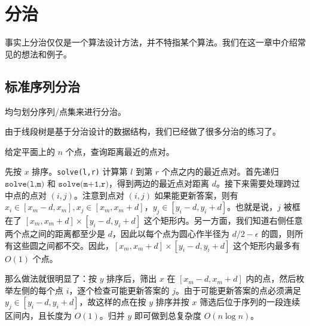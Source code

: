 \chapter{分治}

事实上分治仅仅是一个算法设计方法，并不特指某个算法。我们在这一章中介绍常见的想法和例子。

\section{标准序列分治}

均匀划分序列/点集来进行分治。

\begin{example}[可以用线段树维护的诸多信息]
    由于线段树是基于分治设计的数据结构，我们已经做了很多分治的练习了。
\end{example}

\begin{example}[平面最近点对]
    给定平面上的 $n$ 个点，查询距离最近的点对。
\end{example}
\begin{solution}
    先按 $x$ 排序。\texttt{solve(l,r)} 计算第 $l$ 到第 $r$ 个点之内的最近点对。首先递归 $\texttt{solve(l,m)}$ 和 $\texttt{solve(m+1,r)}$，得到两边的最近点对距离 $d$。接下来需要处理跨过中点的点对 $(i,j)$。注意到点对 $(i,j)$ 如果能更新答案，则有 $x_i\in [x_m-d,x_m],x_j\in[x_m,x_m+d]$，$y_j\in [y_i-d,y_i+d]$。也就是说，$j$ 被框在了 $[x_m,x_m+d]\times [y_i-d,y_i+d]$ 这个矩形内。另一方面，我们知道右侧任意两个点之间的距离都至少是 $d$，因此以每个点为圆心作半径为 $d/2-\epsilon$ 的圆，则所有这些圆之间都不交。因此，$[x_m,x_m+d]\times [y_i-d,y_i+d]$ 这个矩形内最多有 $O(1)$ 个点。

    那么做法就很明显了：按 $y$ 排序后，筛出 $x$ 在 $[x_m-d,x_m+d]$ 内的点，然后枚举左侧的每个点 $i$，逐个检查可能更新答案的 $j$。由于可能更新答案的点必须满足 $y_j\in [y_i-d,y_i+d]$，故这样的点在按 $y$ 排序并按 $x$ 筛选后位于序列的一段连续区间内，且长度为 $O(1)$。归并 $y$ 即可做到总复杂度 $O(n\log n)$。
\end{solution}

